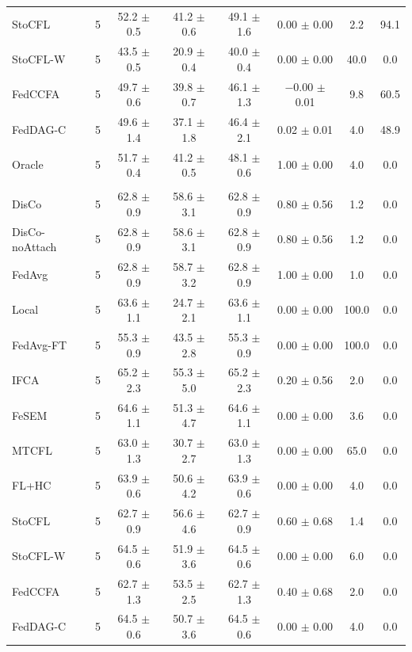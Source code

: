 {{\begin{tabular}{l r c c c c c c}
StoCFL & 5 & 52.2 $\pm$ 0.5 & 41.2 $\pm$ 0.6 & 49.1 $\pm$ 1.6 & 0.00 $\pm$ 0.00 & 2.2 & 94.1 \\
StoCFL-W & 5 & 43.5 $\pm$ 0.5 & 20.9 $\pm$ 0.4 & 40.0 $\pm$ 0.4 & 0.00 $\pm$ 0.00 & 40.0 & 0.0 \\
FedCCFA & 5 & 49.7 $\pm$ 0.6 & 39.8 $\pm$ 0.7 & 46.1 $\pm$ 1.3 & $-$0.00 $\pm$ 0.01 & 9.8 & 60.5 \\
FedDAG-C & 5 & 49.6 $\pm$ 1.4 & 37.1 $\pm$ 1.8 & 46.4 $\pm$ 2.1 & 0.02 $\pm$ 0.01 & 4.0 & 48.9 \\
Oracle & 5 & 51.7 $\pm$ 0.4 & 41.2 $\pm$ 0.5 & 48.1 $\pm$ 0.6 & 1.00 $\pm$ 0.00 & 4.0 & 0.0 \\
\addlinespace
\multicolumn{8}{l}{\textit{FEMNIST}} \\
DisCo & 5 & 62.8 $\pm$ 0.9 & 58.6 $\pm$ 3.1 & 62.8 $\pm$ 0.9 & 0.80 $\pm$ 0.56 & 1.2 & 0.0 \\
DisCo-noAttach & 5 & 62.8 $\pm$ 0.9 & 58.6 $\pm$ 3.1 & 62.8 $\pm$ 0.9 & 0.80 $\pm$ 0.56 & 1.2 & 0.0 \\
FedAvg & 5 & 62.8 $\pm$ 0.9 & 58.7 $\pm$ 3.2 & 62.8 $\pm$ 0.9 & 1.00 $\pm$ 0.00 & 1.0 & 0.0 \\
Local & 5 & 63.6 $\pm$ 1.1 & 24.7 $\pm$ 2.1 & 63.6 $\pm$ 1.1 & 0.00 $\pm$ 0.00 & 100.0 & 0.0 \\
FedAvg-FT & 5 & 55.3 $\pm$ 0.9 & 43.5 $\pm$ 2.8 & 55.3 $\pm$ 0.9 & 0.00 $\pm$ 0.00 & 100.0 & 0.0 \\
IFCA & 5 & 65.2 $\pm$ 2.3 & 55.3 $\pm$ 5.0 & 65.2 $\pm$ 2.3 & 0.20 $\pm$ 0.56 & 2.0 & 0.0 \\
FeSEM & 5 & 64.6 $\pm$ 1.1 & 51.3 $\pm$ 4.7 & 64.6 $\pm$ 1.1 & 0.00 $\pm$ 0.00 & 3.6 & 0.0 \\
MTCFL & 5 & 63.0 $\pm$ 1.3 & 30.7 $\pm$ 2.7 & 63.0 $\pm$ 1.3 & 0.00 $\pm$ 0.00 & 65.0 & 0.0 \\
FL+HC & 5 & 63.9 $\pm$ 0.6 & 50.6 $\pm$ 4.2 & 63.9 $\pm$ 0.6 & 0.00 $\pm$ 0.00 & 4.0 & 0.0 \\
StoCFL & 5 & 62.7 $\pm$ 0.9 & 56.6 $\pm$ 4.6 & 62.7 $\pm$ 0.9 & 0.60 $\pm$ 0.68 & 1.4 & 0.0 \\
StoCFL-W & 5 & 64.5 $\pm$ 0.6 & 51.9 $\pm$ 3.6 & 64.5 $\pm$ 0.6 & 0.00 $\pm$ 0.00 & 6.0 & 0.0 \\
FedCCFA & 5 & 62.7 $\pm$ 1.3 & 53.5 $\pm$ 2.5 & 62.7 $\pm$ 1.3 & 0.40 $\pm$ 0.68 & 2.0 & 0.0 \\
FedDAG-C & 5 & 64.5 $\pm$ 0.6 & 50.7 $\pm$ 3.6 & 64.5 $\pm$ 0.6 & 0.00 $\pm$ 0.00 & 4.0 & 0.0 \\
\bottomrule
\end{tabular}}
}
